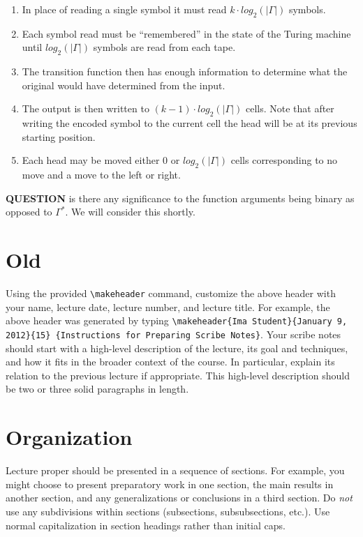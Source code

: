 \documentclass[usletter]{article}
\begin{document}
\begin{enumerate}
  \item In place of reading a single symbol it must read $k \cdot log_2(|\Gamma|)$ symbols.
  \item Each symbol read must be ``remembered'' in the state of the Turing machine until $log_2(|\Gamma|)$ symbols are read from each tape.
  \item The transition function then has enough information to determine what the original would have determined from the input.
  \item The output is then written to $(k - 1) \cdot log_2(|\Gamma|)$ cells. Note that after writing the encoded symbol to the current cell the head will be at its previous starting position.
  \item Each head may be moved either 0 or $log_2(|\Gamma|)$ cells corresponding to no move and a move to the left or right.
\end{enumerate}



\textbf{QUESTION} is there any significance to the function arguments being binary as opposed to $\Gamma^*$. We will consider this shortly.


\section{Old}

Using the provided \verb|\makeheader| command,
customize the above header with your name,
lecture date, lecture number, and lecture title. For
example, the above header was generated by typing
\verb|\makeheader{Ima Student}{January 9, 2012}{15}|{\tt
\{Instructions for Preparing Scribe Notes\}}.  Your
scribe notes should start with a high-level description
of the lecture, its goal and techniques, and how it
fits in the broader context of the course. In
particular, explain its relation to the previous
lecture if appropriate.  This high-level description
should be two or three solid paragraphs in length.

\section{Organization}
Lecture proper should be presented in a sequence of
sections. For example, you might choose to present
preparatory work in one section, the main results in
another section, and any generalizations or conclusions
in a third section. Do \emph{not} use any subdivisions
within sections (subsections, subsubsections, etc.).
Use normal capitalization in section headings rather
than initial caps.
\end{document}

